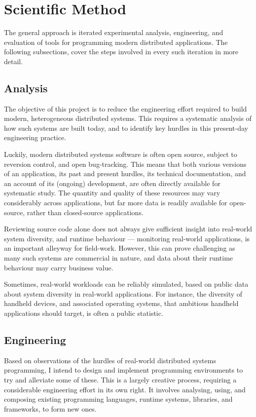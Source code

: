 \section{Scientific Method}
\label{sec:scientific-method}

The general approach is iterated experimental analysis, engineering,
and evaluation of tools for programming modern distributed
applications.  The following subsections, cover the steps involved in
every such iteration in more detail.

\subsection{Analysis}

The objective of this project is to reduce the engineering effort
required to build modern, heterogeneous distributed systems. This
requires a systematic analysis of how such systems are built today,
and to identify key hurdles in this present-day engineering practice.

Luckily, modern distributed systems software is often open source,
subject to reversion control, and open bug-tracking. This means that
both various versions of an application, its past and present hurdles,
its technical documentation, and an account of its (ongoing)
development, are often directly available for systematic study. The
quantity and quality of these resources may vary considerably across
applications, but far more data is readily available for open-source,
rather than closed-source applications.

Reviewing source code alone does not always give sufficient insight
into real-world system diversity, and runtime behaviour --- monitoring
real-world applications, is an important alleyway for field-work.
However, this can prove challenging as many such systems are
commercial in nature, and data about their runtime behaviour may carry
business value.

Sometimes, real-world workloads can be reliably simulated, based on
public data about system diversity in real-world applications. For
instance, the diversity of handheld devices, and associated operating
systems, that ambitious handheld applications should target, is often
a public statistic.

\subsection{Engineering}

Based on observations of the hurdles of real-world distributed systems
programming, I intend to design and implement programming environments
to try and alleviate some of these. This is a largely creative
process, requiring a considerable engineering effort in its own right.
It involves analysing, using, and composing existing programming
languages, runtime systems, libraries, and frameworks, to form new
ones.

